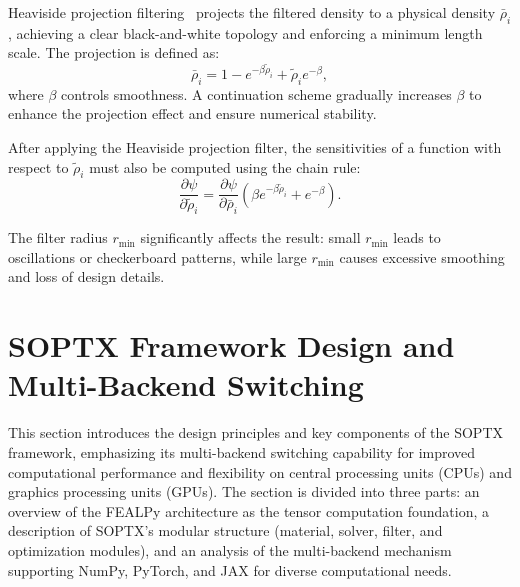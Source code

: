 \documentclass[mathpazo]{cicp}
\begin{document}
Heaviside projection filtering~\cite{guest2004achieving} projects the filtered density to a physical density $\bar{\rho}_i$, achieving a clear black-and-white topology and enforcing a minimum length scale. The projection is defined as:
\begin{equation*}
	\bar\rho_i= 1 - e^{-\beta\tilde\rho_i} + \tilde\rho_ie^{-\beta},
\end{equation*}
where $\beta$ controls smoothness. A continuation scheme gradually increases $\beta$ to enhance the projection effect and ensure numerical stability.

After applying the Heaviside projection filter, the sensitivities of a function with respect to $\tilde\rho_i$ must also be computed using the chain rule:
\begin{equation*}
	\frac{\partial\psi}{\partial\tilde\rho_i} = \frac{\partial\psi}{\partial\bar\rho_i}(\beta{e}^{-\beta\tilde\rho_i} + e^{-\beta}).
\end{equation*}

The filter radius $r_{\min}$ significantly affects the result: small $r_{\min}$ leads to oscillations or checkerboard patterns, while large $r_{\min}$ causes excessive smoothing and loss of design details.

\section{SOPTX Framework Design and Multi-Backend Switching}
This section introduces the design principles and key components of the SOPTX framework, emphasizing its multi-backend switching capability for improved computational performance and flexibility on central processing units (CPUs) and graphics processing units (GPUs). The section is divided into three parts: an overview of the FEALPy architecture as the tensor computation foundation, a description of SOPTX’s modular structure (material, solver, filter, and optimization modules), and an analysis of the multi-backend mechanism supporting NumPy, PyTorch, and JAX for diverse computational needs.
\end{document}
